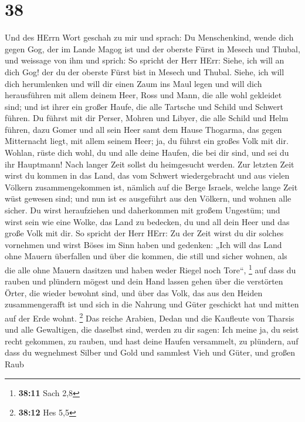 \hypertarget{section-11}{%
\section{38}\label{section-11}}

 Und des HErrn Wort geschah zu mir und sprach: 
Du Menschenkind, wende dich gegen Gog, der im Lande Magog ist und der
oberste Fürst in Mesech und Thubal, und weissage von ihm 
und sprich: So spricht der Herr HErr: Siehe, ich will an dich Gog! der
du der oberste Fürst bist in Mesech und Thubal.  Siehe, ich
will dich herumlenken und will dir einen Zaum ins Maul legen und will
dich herausführen mit allem deinem Heer, Ross und Mann, die alle wohl
gekleidet sind; und ist ihrer ein großer Haufe, die alle Tartsche und
Schild und Schwert führen.  Du führst mit dir Perser, Mohren
und Libyer, die alle Schild und Helm führen,  dazu Gomer und
all sein Heer samt dem Hause Thogarma, das gegen Mitternacht liegt, mit
allem seinem Heer; ja, du führst ein großes Volk mit dir. 
Wohlan, rüste dich wohl, du und alle deine Haufen, die bei dir sind, und
sei du ihr Hauptmann!  Nach langer Zeit sollst du
heimgesucht werden. Zur letzten Zeit wirst du kommen in das Land, das
vom Schwert wiedergebracht und aus vielen Völkern zusammengekommen ist,
nämlich auf die Berge Israels, welche lange Zeit wüst gewesen sind; und
nun ist es ausgeführt aus den Völkern, und wohnen alle sicher.
 Du wirst heraufziehen und daherkommen mit großem Ungestüm;
und wirst sein wie eine Wolke, das Land zu bedecken, du und all dein
Heer und das große Volk mit dir.  So spricht der Herr HErr:
Zu der Zeit wirst du dir solches vornehmen und wirst Böses im Sinn haben
 und gedenken: „Ich will das Land ohne Mauern überfallen
und über die kommen, die still und sicher wohnen, als die alle ohne
Mauern dasitzen und haben weder Riegel noch Tore``, \footnote{\textbf{38:11}
  Sach 2,8}  auf dass du rauben und plündern mögest und
dein Hand lassen gehen über die verstörten Örter, die wieder bewohnt
sind, und über das Volk, das aus den Heiden zusammengerafft ist und sich
in die Nahrung und Güter geschickt hat und mitten auf der Erde wohnt.
\footnote{\textbf{38:12} Hes 5,5}  Das reiche Arabien,
Dedan und die Kaufleute von Tharsis und alle Gewaltigen, die daselbst
sind, werden zu dir sagen: Ich meine ja, du seist recht gekommen, zu
rauben, und hast deine Haufen versammelt, zu plündern, auf dass du
wegnehmest Silber und Gold und sammlest Vieh und Güter, und großen Raub
